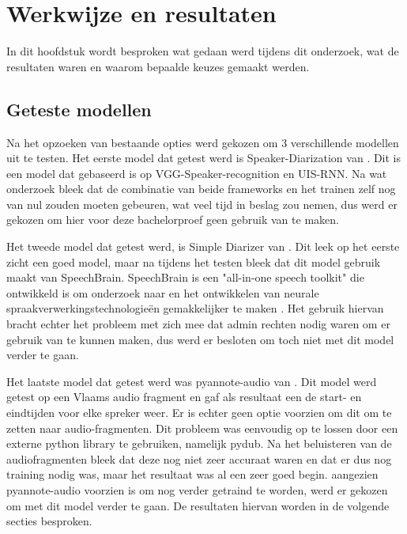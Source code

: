 
\chapter{Werkwijze en resultaten}%
\label{ch:resultaten}
In dit hoofdstuk wordt besproken wat gedaan werd tijdens dit onderzoek, wat de resultaten waren en waarom bepaalde keuzes gemaakt werden.

\section{Geteste modellen}
\label{sec:modellen}
Na het opzoeken van bestaande opties werd gekozen om 3 verschillende modellen uit te testen. Het eerste model dat getest werd is Speaker-Diarization van \textcite{DongLu}. Dit is een model dat gebaseerd is op VGG-Speaker-recognition en UIS-RNN. Na wat onderzoek bleek dat de combinatie van beide frameworks en het trainen zelf nog van nul zouden moeten gebeuren, wat veel tijd in beslag zou nemen, dus werd er gekozen om hier voor deze bachelorproef geen gebruik van te maken.

Het tweede model dat getest werd, is Simple Diarizer van \textcite{Chau}. Dit leek op het eerste zicht een goed model, maar na tijdens het testen bleek dat dit model gebruik maakt van SpeechBrain. SpeechBrain is een "all-in-one speech toolkit" die ontwikkeld is om onderzoek naar en het ontwikkelen van neurale spraakverwerkingstechnologieën gemakkelijker te maken \autocite{speechbrain}. Het gebruik hiervan bracht echter het probleem met zich mee dat admin rechten nodig waren om er gebruik van te kunnen maken, dus werd er besloten om toch niet met dit model verder te gaan.

Het laatste model dat getest werd was pyannote-audio van \textcite{Bredin2024}. Dit model werd getest op een Vlaams audio fragment en gaf als resultaat een de start- en eindtijden voor elke spreker weer. Er is echter geen optie voorzien om dit om te zetten naar audio-fragmenten. Dit probleem was eenvoudig op te lossen door een externe python library te gebruiken, namelijk pydub. Na het beluisteren van de audiofragmenten bleek dat deze nog niet zeer accuraat waren en dat er dus nog training nodig was, maar het resultaat was al een zeer goed begin. aangezien pyannote-audio voorzien is om nog verder getraind te worden, werd er gekozen om met dit model verder te gaan. De resultaten hiervan worden in de volgende secties besproken.

